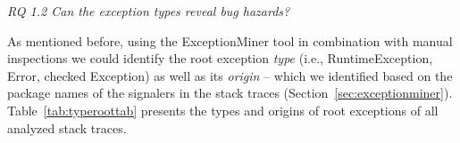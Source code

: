 
\bigskip


\bigskip

\noindent\emph{RQ 1.2 Can the exception types reveal bug hazards?}

\bigskip

As mentioned before, using the ExceptionMiner tool in combination with manual inspections we could identify
the root exception \emph{type} (i.e., RuntimeException, Error, checked Exception) as well as its \emph{origin} -- which we
identified based on the package names of the signalers in the stack traces (Section~\ref{sec:exceptionminer}).
Table~\ref{tab:typeroottab} presents the types and origins of root exceptions of all analyzed stack traces.


